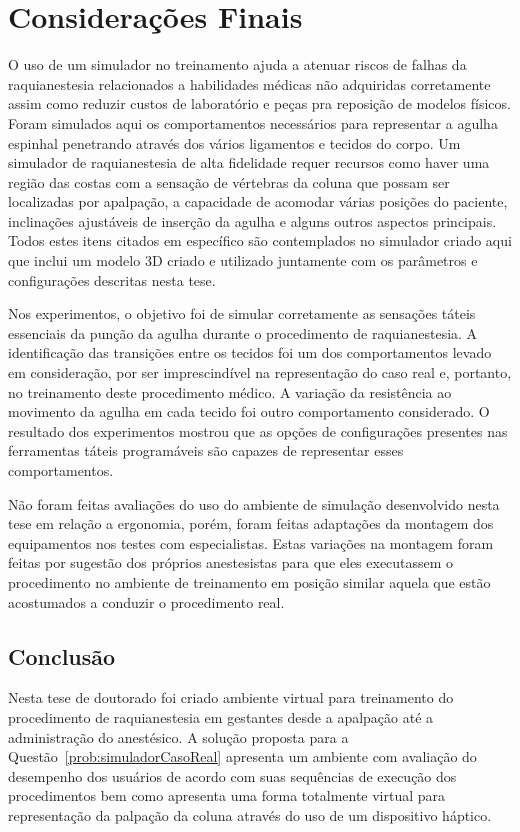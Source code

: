 \chapter{Considerações Finais} \label{cap:cap7}

O uso de um simulador no treinamento ajuda a atenuar riscos de falhas da raquianestesia relacionados a habilidades médicas não adquiridas corretamente assim como reduzir custos de laboratório e peças pra reposição de modelos físicos. Foram simulados aqui os comportamentos necessários para representar a agulha espinhal penetrando através dos vários ligamentos e tecidos do corpo. Um simulador de raquianestesia de alta fidelidade requer recursos como haver uma região das costas com a sensação de vértebras da coluna que possam ser localizadas por apalpação, a capacidade de acomodar várias posições do paciente, inclinações ajustáveis de inserção da agulha e alguns outros aspectos principais. Todos estes itens citados em específico são contemplados no simulador criado aqui que inclui um modelo 3D criado e utilizado juntamente com os parâmetros e configurações descritas nesta tese. 

Nos experimentos, o objetivo foi de simular corretamente as sensações táteis essenciais da punção da agulha durante o procedimento de raquianestesia. A identificação das transições entre os tecidos foi um dos comportamentos levado em consideração, por ser imprescindível na representação do caso real e, portanto, no treinamento deste procedimento médico.
A variação da resistência ao movimento da agulha em cada tecido foi outro comportamento considerado. O resultado dos experimentos mostrou que as opções de configurações presentes nas ferramentas táteis programáveis são capazes de representar esses comportamentos.

Não foram feitas avaliações do uso do ambiente de simulação desenvolvido nesta tese em relação a ergonomia, porém, foram feitas adaptações da montagem dos equipamentos nos testes com especialistas. Estas variações na montagem foram feitas por sugestão dos próprios anestesistas para que eles executassem o procedimento no ambiente de treinamento em posição similar aquela que estão acostumados a conduzir o procedimento real.

\section{Conclusão}
\label{sec:conclusão}

Nesta tese de doutorado foi criado ambiente virtual para treinamento do procedimento de raquianestesia em gestantes desde a apalpação até a administração do anestésico. A solução proposta para a Questão~\ref{prob:simuladorCasoReal} apresenta um ambiente com avaliação do desempenho dos usuários de acordo com suas sequências de execução dos procedimentos bem como apresenta uma forma totalmente virtual para representação da palpação da coluna através do uso de um dispositivo háptico.


